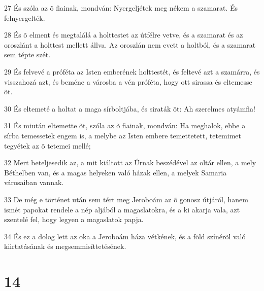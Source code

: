 \par 27 És szóla az õ fiainak, mondván: Nyergeljétek meg nékem a szamarat. És felnyergelték.
\par 28 És õ elment és megtalálá a holttestet az útfélre vetve, és a szamarat és az oroszlánt a holttest mellett állva. Az oroszlán nem evett a holtból, és a szamarat sem tépte szét.
\par 29 És felvevé a próféta az Isten emberének holttestét, és feltevé azt a szamárra, és visszahozá azt, és beméne a városba a vén próféta, hogy ott sirassa és eltemesse õt.
\par 30 És eltemeté a holtat a maga sírboltjába, és siraták õt: Ah szerelmes atyámfia!
\par 31 És miután eltemette õt, szóla az õ fiainak, mondván: Ha meghalok, ebbe a sírba temessetek engem is, a melybe az Isten embere temettetett, tetemimet tegyétek az õ tetemei mellé;
\par 32 Mert beteljesedik az, a mit kiáltott az Úrnak beszédével az oltár ellen, a mely Béthelben van, és a magas helyeken való házak ellen, a melyek Samaria városaiban vannak.
\par 33 De még e történet után sem tért meg Jeroboám az õ gonosz útjáról, hanem ismét papokat rendele a nép aljából a magaslatokra, és a ki akarja vala, azt szentelé fel, hogy legyen a magaslatok papja.
\par 34 És ez a dolog lett az oka a Jeroboám háza vétkének, és a föld színérõl való kiirtatásának és megsemmisíttetésének.

\chapter{14}


